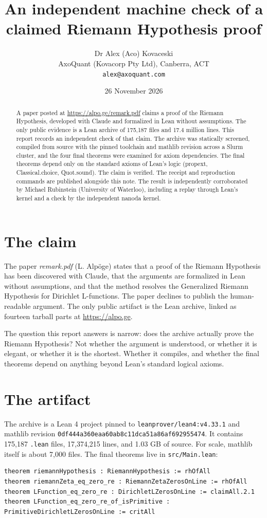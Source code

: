 \documentclass[11pt]{article}
\title{An independent machine check of a claimed Riemann Hypothesis proof}
\author{Dr Alex (Aco) Kovaceski\\AxoQuant (Kovacorp Pty Ltd), Canberra, ACT\\\texttt{alex@axoquant.com}}
\date{26 November 2026}
\begin{document}
\maketitle

\begin{abstract}
A paper posted at \url{https://alpo.ge/remark.pdf} claims a proof of the Riemann Hypothesis, developed with Claude and formalized in Lean without assumptions. The only public evidence is a Lean archive of 175,187 files and 17.4 million lines. This report records an independent check of that claim. The archive was statically screened, compiled from source with the pinned toolchain and mathlib revision across a Slurm cluster, and the four final theorems were examined for axiom dependencies. The final theorems depend only on the standard axioms of Lean's logic (propext, Classical.choice, Quot.sound). The claim is verified. The receipt and reproduction commands are published alongside this note. The result is independently corroborated by Michael Rubinstein (University of Waterloo), including a replay through Lean's kernel and a check by the independent nanoda kernel.
\end{abstract}

\section{The claim}
The paper \emph{remark.pdf} (L. Alp\"oge) states that a proof of the Riemann Hypothesis has been discovered with Claude, that the arguments are formalized in Lean without assumptions, and that the method resolves the Generalized Riemann Hypothesis for Dirichlet L-functions. The paper declines to publish the human-readable argument. The only public artifact is the Lean archive, linked as fourteen tarball parts at \url{https://alpo.ge}.

The question this report answers is narrow: does the archive actually prove the Riemann Hypothesis? Not whether the argument is understood, or whether it is elegant, or whether it is the shortest. Whether it compiles, and whether the final theorems depend on anything beyond Lean's standard logical axioms.

\section{The artifact}
The archive is a Lean 4 project pinned to \texttt{leanprover/lean4:v4.33.1} and mathlib revision \texttt{0df444a360eaa60ab8c11dca51a86af692955474}. It contains 175,187 \texttt{.lean} files, 17,374,215 lines, and 1.03 GB of source. For scale, mathlib itself is about 7,000 files. The final theorems live in \texttt{src/Main.lean}:
\begin{verbatim}
theorem riemannHypothesis : RiemannHypothesis := rhOfAll
theorem riemannZeta_eq_zero_re : RiemannZetaZerosOnLine := rhOfAll
theorem LFunction_eq_zero_re : DirichletLZerosOnLine := claimAll.2.1
theorem LFunction_eq_zero_re_of_isPrimitive : PrimitiveDirichletLZerosOnLine := critAll
\end{verbatim}
\end{document}
